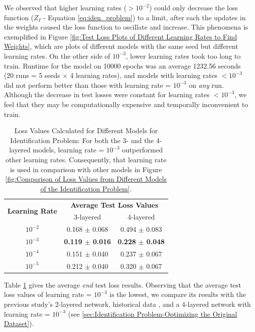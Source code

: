 \documentclass[12pt]{article}
\begin{document}
    We observed that higher learning rates ($>10^{-2}$) could only decrease the loss function ($Z_I$ - Equation \ref{eq:iden_problem}) to a limit, after each the updates in the weights caused the loss function to oscillate and increase. This phenomena is exemplified in Figure \ref{fig:Test Loss Plots of Different Learning Rates to Find Weights}, which are plots of different models with the same seed but different learning rates. On the other side of $10^{-3}$, lower learning rates took too long to train. Runtime for the model on 10000 epochs was an average 1232.56 seconds (20 runs = 5 seeds $\times$ 4 learning rates), and models with learning rates $< 10^{-3}$ did not perform better than those with learning rate = $10^{-3}$ on \textit{any} run. Although the decrease in test losses were constant for learning rates $< 10^{-3}$, we feel that they may be computationally expensive and temporally inconvenient to train.
    \begin{table}[!htbp]
        \centering
        \caption[Loss Values Calculated for Different Models for Identification Problem]{Loss Values Calculated for Different Models for Identification Problem: For both the 3- and the 4-layered models, learning rate = $10^{-3}$ outperformed other learning rates. Consequently, that learning rate is used in comparison with other models in Figure \ref{fig:Comparison of Loss Values from Different Models of the Identification Problem}.}
        \label{tab:Loss Values Calculated for Different Models for Identification Problem}
        \begin{tabular}{c | c | c}
            \hline
            \multirow{2}{*}{\textbf{Learning Rate}} & \multicolumn{2}{c}{\textbf{Average Test Loss Values}} \\
            & 3-layered & 4-layered\\
            \hline
            $10^{-2}$ & 0.168 $\pm$ 0.068 & 0.494 $\pm$ 0.083\\
            $10^{-3}$ & \textbf{0.119 $\pm$ 0.016} & \textbf{0.228 $\pm$ 0.048}\\
            $10^{-4}$ & 0.151 $\pm$ 0.040 & 0.237 $\pm$ 0.067\\
            $10^{-5}$ & 0.212 $\pm$ 0.040 & 0.320 $\pm$ 0.067\\
            \hline
        \end{tabular}
    \end{table}
    
    Table \ref{tab:Loss Values Calculated for Different Models for Identification Problem} gives the average \textit{end} test loss results. Observing that the average test loss values of learning rate = $10^{-3}$ is the lowest, we compare its results with the previous study's 2-layered network, historical data \cite[// todo]{Xue2016Avi2}, and a 4-layered network with learning rate = $10^{-3}$ (see \cref{sec:Identification Problem-Optimizing the Original Dataset}).
    
\end{document}
